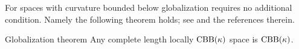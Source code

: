 For spaces with curvature bounded below globalization requires no additional condition.
Namely the following theorem holds; see \cite{alexander-kapovitch-petrunin-2025} and the references therein.

\begin{thm}{Globalization theorem}\label{thm:cbb-globalization}
Any complete length locally $\mathrm{CBB}(\kappa)$ space is $\mathrm{CBB}(\kappa)$.
\end{thm}




